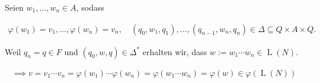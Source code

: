 \begin{solution}
Seien $w_1, \dots, w_n \in A$, sodass

\begin{align*}
    \varphi(w_1) = v_1, \dots, \varphi(w_n) = v_n,
    \quad
    (q_0, w_1, q_1), \dots, (q_{n-1}, w_n, q_n) \in \Delta \subseteq Q \times A \times Q.
\end{align*}

Weil $q_n = q \in F$ und $(q_0, w, q) \in \Delta^\ast$ erhalten wir, dass $w := w_1 \cdots w_n \in \operatorname L(N)$.

\begin{align*}
    \implies
    v
    =
    v_1 \cdots v_n
    =
    \varphi(w_1) \cdots \varphi(w_n)
    =
    \varphi(w_1 \cdots w_n)
    =
    \varphi(w)
    \in
    \varphi(\operatorname L(N))
\end{align*}

\end{solution}

